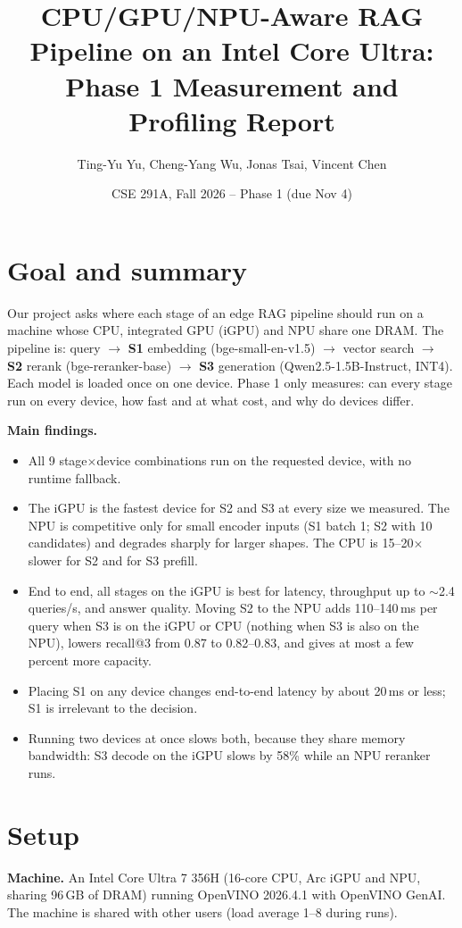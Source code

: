 \documentclass[10pt]{article}
\title{\vspace{-1em}CPU/GPU/NPU-Aware RAG Pipeline on an Intel Core Ultra:\\Phase 1 Measurement and Profiling Report}
\author{Ting-Yu Yu, Cheng-Yang Wu, Jonas Tsai, Vincent Chen}
\date{CSE 291A, Fall 2026 \;--\; Phase 1 (due Nov 4)}
\begin{document}
\maketitle
\vspace{-2em}

\section{Goal and summary}
Our project asks where each stage of an edge RAG pipeline should run on a machine whose CPU, integrated GPU (iGPU) and NPU share one DRAM. The pipeline is: query $\rightarrow$ \textbf{S1} embedding (bge-small-en-v1.5) $\rightarrow$ vector search $\rightarrow$ \textbf{S2} rerank (bge-reranker-base) $\rightarrow$ \textbf{S3} generation (Qwen2.5-1.5B-Instruct, INT4). Each model is loaded once on one device. Phase 1 only measures: can every stage run on every device, how fast and at what cost, and why do devices differ.

\textbf{Main findings.}
\begin{itemize}\setlength\itemsep{0pt}
\item All 9 stage$\times$device combinations run on the requested device, with no runtime fallback.
\item The iGPU is the fastest device for S2 and S3 at every size we measured. The NPU is competitive only for small encoder inputs (S1 batch 1; S2 with 10 candidates) and degrades sharply for larger shapes. The CPU is 15--20$\times$ slower for S2 and for S3 prefill.
\item End to end, all stages on the iGPU is best for latency, throughput up to $\sim$2.4 queries/s, and answer quality. Moving S2 to the NPU adds 110--140\,ms per query when S3 is on the iGPU or CPU (nothing when S3 is also on the NPU), lowers recall@3 from 0.87 to 0.82--0.83, and gives at most a few percent more capacity.
\item Placing S1 on any device changes end-to-end latency by about 20\,ms or less; S1 is irrelevant to the decision.
\item Running two devices at once slows both, because they share memory bandwidth: S3 decode on the iGPU slows by 58\% while an NPU reranker runs.
\end{itemize}

\section{Setup}
\textbf{Machine.} An Intel Core Ultra 7 356H (16-core CPU, Arc iGPU and NPU, sharing 96\,GB of DRAM) running OpenVINO 2026.4.1 with OpenVINO GenAI. The machine is shared with other users (load average 1--8 during runs).
\end{document}
